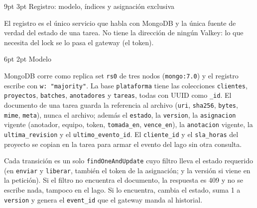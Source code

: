 \documentclass[10pt,letterpaper]{article}
\makeatletter
\renewcommand\section{\@startsection{section}{1}{\z@}%
  {9pt \@plus 2pt \@minus 1pt}{3pt}%
  {\normalfont\large\bfseries\color{acc}}}
\renewcommand\subsection{\@startsection{subsection}{2}{\z@}%
  {6pt \@plus 1pt}{2pt}%
  {\normalfont\normalsize\bfseries\color{acc}}}
\makeatother
\begin{document}
\section{Registro: modelo, índices y asignación exclusiva}

El registro es el único servicio que habla con MongoDB y la única fuente de verdad del estado de una
tarea. No tiene la dirección de ningún Valkey: lo que necesita del lock se lo pasa el gateway (el token).

\subsection{Modelo}

MongoDB corre como replica set \texttt{rs0} de tres nodos (\texttt{mongo:7.0}) y el registro escribe con
\texttt{w: "majority"}. La base \texttt{plataforma} tiene las colecciones \texttt{clientes},
\texttt{proyectos}, \texttt{batches}, \texttt{anotadores} y \texttt{tareas}, todas con UUID como
\texttt{\_id}. El documento de una tarea guarda la referencia al archivo (\texttt{uri}, \texttt{sha256},
\texttt{bytes}, \texttt{mime}, \texttt{meta}), nunca el archivo; además el \texttt{estado}, la
\texttt{version}, la \texttt{asignacion} vigente (anotador, equipo, token, \texttt{tomada\_en},
\texttt{vence\_en}), la \texttt{anotacion} vigente, la \texttt{ultima\_revision} y el
\texttt{ultimo\_evento\_id}. El \texttt{cliente\_id} y el \texttt{sla\_horas} del proyecto se copian en la
tarea para armar el evento del lago sin otra consulta.

Cada transición es un solo \texttt{findOneAndUpdate} cuyo filtro lleva el estado requerido (en
\texttt{enviar} y \texttt{liberar}, también el token de la asignación; y la versión si viene en la petición). Si el filtro no encuentra el documento,
la respuesta es 409 y no se escribe nada, tampoco en el lago. Si lo encuentra, cambia el estado, suma 1 a
\texttt{version} y genera el \texttt{event\_id} que el gateway manda al historial.
\end{document}
